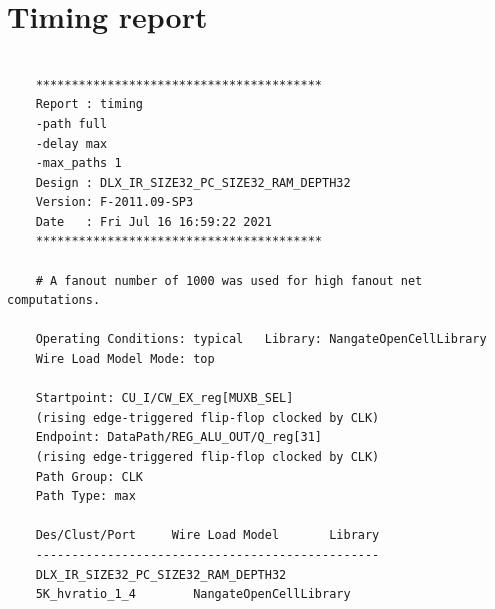 \section{Timing report}
\begin{lstlisting}
	 
	****************************************
	Report : timing
	-path full
	-delay max
	-max_paths 1
	Design : DLX_IR_SIZE32_PC_SIZE32_RAM_DEPTH32
	Version: F-2011.09-SP3
	Date   : Fri Jul 16 16:59:22 2021
	****************************************
	
	# A fanout number of 1000 was used for high fanout net computations.
	
	Operating Conditions: typical   Library: NangateOpenCellLibrary
	Wire Load Model Mode: top
	
	Startpoint: CU_I/CW_EX_reg[MUXB_SEL]
	(rising edge-triggered flip-flop clocked by CLK)
	Endpoint: DataPath/REG_ALU_OUT/Q_reg[31]
	(rising edge-triggered flip-flop clocked by CLK)
	Path Group: CLK
	Path Type: max
	
	Des/Clust/Port     Wire Load Model       Library
	------------------------------------------------
	DLX_IR_SIZE32_PC_SIZE32_RAM_DEPTH32
	5K_hvratio_1_4        NangateOpenCellLibrary
	

\end{lstlisting}
